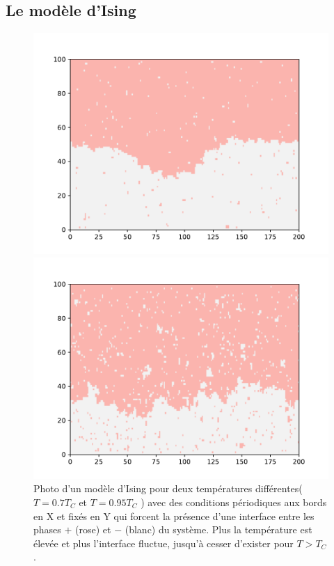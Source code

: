     \subsection{Le modèle d'Ising}
\begin{figure}
	\begin{minipage}[t]{0.5\linewidth}
		\includegraphics[width=\linewidth]{int-dyn/inte07.pdf}
	\end{minipage}%
	\begin{minipage}[t]{0.5\linewidth}
		\includegraphics[width=\linewidth]{int-dyn/inte09.pdf}
	\end{minipage}
	\caption{Photo d'un modèle d'Ising pour deux températures différentes($T=0.7 T_C$ et $T=0.95 T_C$ ) avec des conditions périodiques aux bords en X et fixés en Y qui forcent la présence d'une interface entre les phases $+$ (rose) et $-$ (blanc) du système. Plus la température est élevée et plus l'interface fluctue, jusqu'à cesser d'exister pour $T \greater T_C$. }
	\label{amas-fixe}
\end{figure}  

